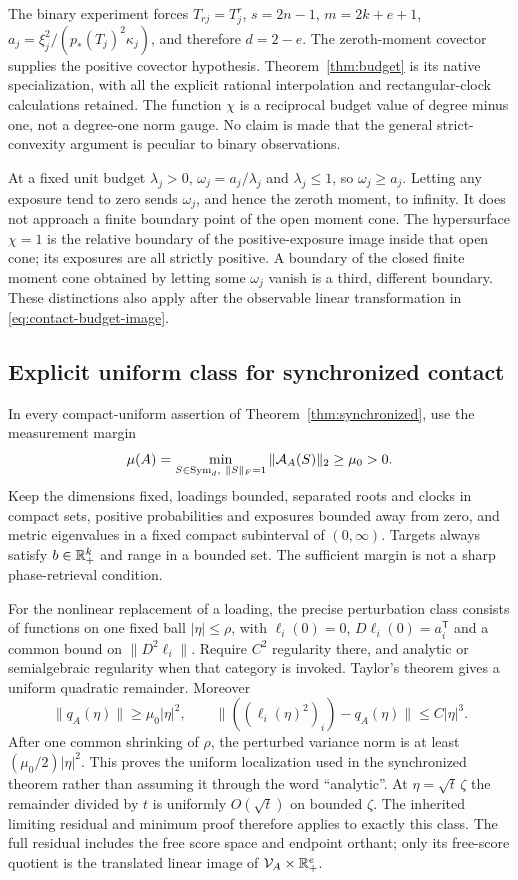 The binary experiment forces $T_{rj}=T_j^r$, $s=2n-1$, $m=2k+e+1$, $a_j=\xi_j^2/(p_*(T_j)^2\kappa_j)$, and therefore $d=2-e$. The zeroth-moment covector supplies the positive covector hypothesis. Theorem~\ref{thm:budget} is its native specialization, with all the explicit rational interpolation and rectangular-clock calculations retained. The function $\chi$ is a reciprocal budget value of degree minus one, not a degree-one norm gauge. No claim is made that the general strict-convexity argument is peculiar to binary observations.

At a fixed unit budget $\lambda_j>0$, $\omega_j=a_j/\lambda_j$ and $\lambda_j\le1$, so $\omega_j\ge a_j$. Letting any exposure tend to zero sends $\omega_j$, and hence the zeroth moment, to infinity. It does not approach a finite boundary point of the open moment cone. The hypersurface $\chi=1$ is the relative boundary of the positive-exposure image inside that open cone; its exposures are all strictly positive. A boundary of the closed finite moment cone obtained by letting some $\omega_j$ vanish is a third, different boundary. These distinctions also apply after the observable linear transformation in \eqref{eq:contact-budget-image}.

\subsection{Explicit uniform class for synchronized contact}\label{sec:uniform-class}
In every compact-uniform assertion of Theorem~\ref{thm:synchronized}, use the measurement margin
\[
 \mu(A)=\min_{S\in\operatorname{Sym}_d,\ \|S\|_F=1}\|\mathcal A_A(S)\|_2\ge\mu_0>0.
\]
Keep the dimensions fixed, loadings bounded, separated roots and clocks in compact sets, positive probabilities and exposures bounded away from zero, and metric eigenvalues in a fixed compact subinterval of $(0,\infty)$. Targets always satisfy $b\in\mathbb R_+^k$ and range in a bounded set. The sufficient margin is not a sharp phase-retrieval condition.

For the nonlinear replacement of a loading, the precise perturbation class consists of functions on one fixed ball $|\eta|\le\rho$, with $\ell_i(0)=0$, $D\ell_i(0)=a_i^{\mathsf T}$ and a common bound on $\|D^2\ell_i\|$. Require $C^2$ regularity there, and analytic or semialgebraic regularity when that category is invoked. Taylor's theorem gives a uniform quadratic remainder. Moreover
\[
 \|q_A(\eta)\|\ge\mu_0|\eta|^2,\qquad
 \|((\ell_i(\eta)^2)_i)-q_A(\eta)\|\le C|\eta|^3.
\]
After one common shrinking of $\rho$, the perturbed variance norm is at least $(\mu_0/2)|\eta|^2$. This proves the uniform localization used in the synchronized theorem rather than assuming it through the word ``analytic''. At $\eta=\sqrt t\,\zeta$ the remainder divided by $t$ is uniformly $O(\sqrt t)$ on bounded $\zeta$. The inherited limiting residual and minimum proof therefore applies to exactly this class. The full residual includes the free score space and endpoint orthant; only its free-score quotient is the translated linear image of $\mathcal V_A\times\mathbb R_+^e$.

